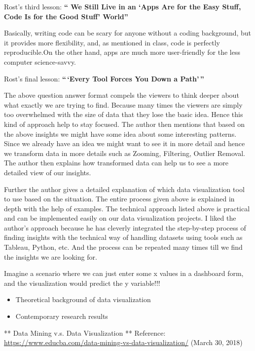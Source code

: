 \documentclass[]{book}
\providecommand{\tightlist}{%
  \setlength{\itemsep}{0pt}\setlength{\parskip}{0pt}}
\theoremstyle{definition}
\theoremstyle{definition}
\theoremstyle{definition}
\theoremstyle{remark}
\begin{document}
Rost's third lesson: \textbf{`` We Still Live in an `Apps Are for the
Easy Stuff, Code Is for the Good Stuff' World''}

Basically, writing code can be scary for anyone without a coding
background, but it provides more flexibility, and, as mentioned in
class, code is perfectly reproducible.On the other hand, apps are much
more user-friendly for the less computer science-savvy.

Rost's final lesson: \textbf{``\,`Every Tool Forces You Down a
Path'\,''}

The above question answer format compels the viewers to think deeper
about what exactly we are trying to find. Because many times the viewers
are simply too overwhelmed with the size of data that they lose the
basic idea. Hence this kind of approach help to stay focused. The author
then mentions that based on the above insights we might have some idea
about some interesting patterns. Since we already have an idea we might
want to see it in more detail and hence we transform data in more
details such as Zooming, Filtering, Outlier Removal. The author then
explains how transformed data can help us to see a more detailed view of
our insights.

Further the author gives a detailed explanation of which data
visualization tool to use based on the situation. The entire process
given above is explained in depth with the help of examples. The
technical approach listed above is practical and can be implemented
easily on our data visualization projects. I liked the author's approach
because he has cleverly integrated the step-by-step process of finding
insights with the technical way of handling datasets using tools such as
Tableau, Python, etc. And the process can be repeated many times till we
find the insights we are looking for.

\citep{great_viz} Imagine a scenario where we can just enter some x
values in a dashboard form, and the visualization would predict the y
variable!!!

\begin{itemize}
\tightlist
\item
  Theoretical background of data visualization
\item
  Contemporary research results
\end{itemize}

\citep{LinkedIn_Groups}

** Data Mining v.s. Data Visualization ** Reference:
\url{https://www.educba.com/data-mining-vs-data-visualization/} (March
30, 2018)
\end{document}
